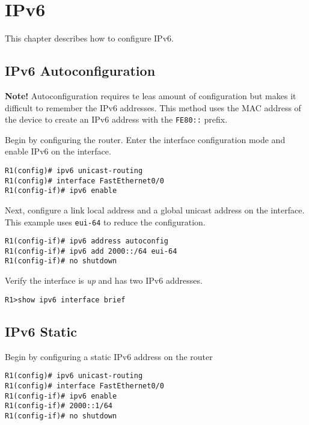 \section{IPv6}
This chapter describes how to configure IPv6.

\subsection{IPv6 Autoconfiguration}
\begin{tcolorbox}
\textbf{Note!} Autoconfiguration requires te leas amount of configuration but makes it difficult to remember the IPv6 addresses.
This method uses the MAC address of the device to create an IPv6 address with the \verb!FE80::! prefix.
\end{tcolorbox}
Begin by configuring the router. Enter the interface configuration mode and enable IPv6 on the interface.
\begin{verbatim}
R1(config)# ipv6 unicast-routing
R1(config)# interface FastEthernet0/0
R1(config-if)# ipv6 enable
\end{verbatim}
Next, configure a link local address and a global unicast address on the interface. This example uses \verb!eui-64! to reduce the configuration.
\begin{verbatim}
R1(config-if)# ipv6 address autoconfig
R1(config-if)# ipv6 add 2000::/64 eui-64
R1(config-if)# no shutdown
\end{verbatim}
Verify the interface is \textit{up} and has two IPv6 addresses.
\begin{verbatim}
R1>show ipv6 interface brief
\end{verbatim}

\subsection{IPv6 Static}
Begin by configuring a static IPv6 address on the router
\begin{verbatim}
R1(config)# ipv6 unicast-routing
R1(config)# interface FastEthernet0/0
R1(config-if)# ipv6 enable
R1(config-if)# 2000::1/64
R1(config-if)# no shutdown
\end{verbatim}
